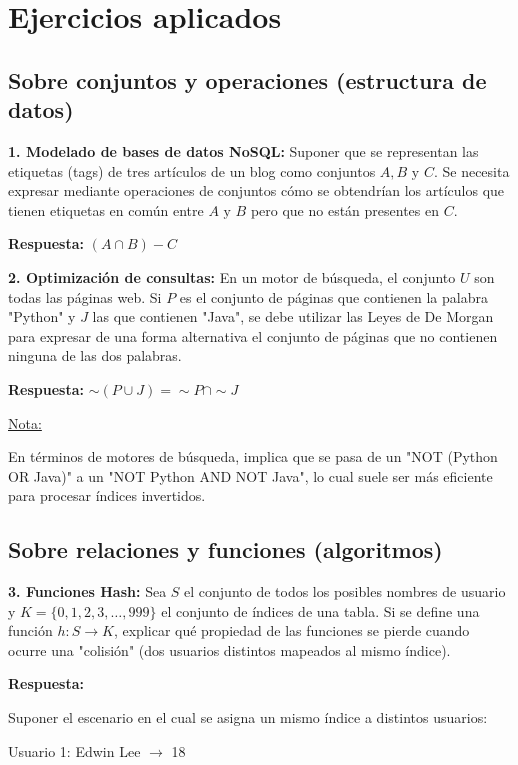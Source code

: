 \documentclass{article}
\begin{document}
\section{Ejercicios aplicados}

\subsection{Sobre conjuntos y operaciones (estructura de datos)}

\textbf{1. Modelado de bases de datos NoSQL:} Suponer que se representan las etiquetas (tags) de tres artículos de un blog como conjuntos $A, B \text{ y } C$. Se necesita expresar mediante operaciones de conjuntos cómo se obtendrían los artículos que tienen etiquetas en común entre $A \text{ y } B$ pero que no están presentes en $C$.

\textbf{Respuesta: } $(A \cap B) - C$

\textbf{2. Optimización de consultas:} En un motor de búsqueda, el conjunto $U$ son todas las páginas web. Si $P$ es el conjunto de páginas que contienen la palabra "Python" y $J$ las que contienen "Java", se debe utilizar las Leyes de De Morgan para expresar de una forma alternativa el conjunto de páginas que no contienen ninguna de las dos palabras.

\textbf{Respuesta: } $\sim(P \cup J) = \sim P \cap \sim J$

\underline{Nota:}

En términos de motores de búsqueda, implica que se pasa de un "NOT (Python OR Java)" a un "NOT Python AND NOT Java", lo cual suele ser más eficiente para procesar índices invertidos. 

\subsection{Sobre relaciones y funciones (algoritmos)}

\textbf{3. Funciones Hash:} Sea $S$ el conjunto de todos los posibles nombres de usuario y $K = \{0, 1, 2, 3, \dots, 999\}$ el conjunto de índices de una tabla. Si se define una función $h: S \to K$, explicar qué propiedad de las funciones se pierde cuando ocurre una "colisión" (dos usuarios distintos mapeados al mismo índice).

\textbf{Respuesta:}

Suponer el escenario en el cual se asigna un mismo índice a distintos usuarios:

Usuario 1: Edwin Lee $\to$ 18
\end{document}
